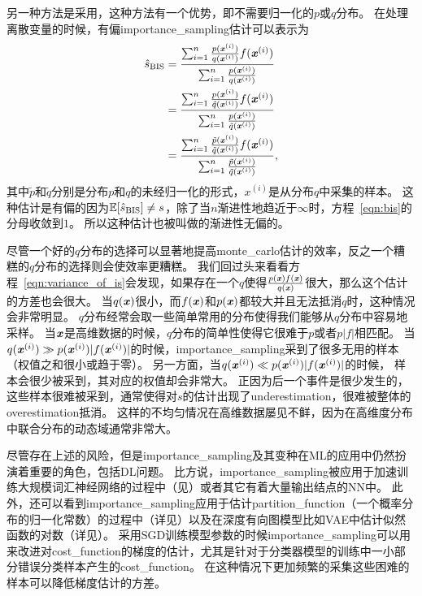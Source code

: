 另一种方法是采用，这种方法有一个优势，即不需要归一化的$p$或$q$分布。
在处理离散变量的时候，有偏\gls{importance_sampling}估计可以表示为
\begin{align}
\label{eqn:bis}
\hat{s}_{\text{BIS}} & = \frac{\sum_{i=1}^{n} \frac{p(\boldsymbol{\mathit{x}}^{(i)})}{q(\boldsymbol{\mathit{x}}^{(i)})} f(\boldsymbol{\mathit{x}}^{(i)})}{\sum_{i=1}^{n}\frac{p(\boldsymbol{\mathit{x}}^{(i)})}{q(\boldsymbol{\mathit{x}}^{(i)})}} \\
& = \frac{\sum_{i=1}^{n} \frac{p(\boldsymbol{\mathit{x}}^{(i)})}{\tilde{q}(\boldsymbol{\mathit{x}}^{(i)})} f(\boldsymbol{\mathit{x}}^{(i)})}{\sum_{i=1}^{n}\frac{p(\boldsymbol{\mathit{x}}^{(i)})}{\tilde{q}(\boldsymbol{\mathit{x}}^{(i)})}} \\
& = \frac{\sum_{i=1}^{n} \frac{\tilde{p}(\boldsymbol{\mathit{x}}^{(i)})}{\tilde{q}(\boldsymbol{\mathit{x}}^{(i)})} f(\boldsymbol{\mathit{x}}^{(i)})}{\sum_{i=1}^{n}\frac{\tilde{p}(\boldsymbol{\mathit{x}}^{(i)})}{\tilde{q}(\boldsymbol{\mathit{x}}^{(i)})}},
\end{align}
其中$\tilde{p}$和$\tilde{q}$分别是分布${p}$和${q}$的未经归一化的形式，$x^{(i)}$是从分布${q}$中采集的样本。
这种估计是有偏的因为$\mathbb{E}[\hat{s}_{\text{BIS}}]\neq s$，除了当$n$渐进性地趋近于$\infty$时，方程~\eqref{eqn:bis}的分母收敛到$1$。
所以这种估计也被叫做的渐进性无偏的。

尽管一个好的$q$分布的选择可以显著地提高\gls{monte_carlo}估计的效率，反之一个糟糕的$q$分布的选择则会使效率更糟糕。
我们回过头来看看方程~\eqref{eqn:variance_of_is}会发现，如果存在一个$q$使得$\frac{p(\boldsymbol{\mathit{x}})f(\boldsymbol{\mathit{x}})}{q(\boldsymbol{\mathit{x}})}$很大，那么这个估计的方差也会很大。
当$q(\boldsymbol{\mathit{x}})$很小，而$f(\boldsymbol{\mathit{x}})$和$p(\boldsymbol{\mathit{x}})$都较大并且无法抵消$q$时，这种情况会非常明显。
$q$分布经常会取一些简单常用的分布使得我们能够从$q$分布中容易地采样。
当$\boldsymbol{\mathit{x}}$是高维数据的时候，$q$分布的简单性使得它很难于$p$或者$p\vert f\vert$相匹配。
当$q(\boldsymbol{\mathit{x}}^{(i)})\gg p(\boldsymbol{\mathit{x}}^{(i)}) \vert f(\boldsymbol{\mathit{x}}^{(i)})\vert $的时候，\gls{importance_sampling}采到了很多无用的样本（权值之和很小或趋于零）。
另一方面，当$q(\boldsymbol{\mathit{x}}^{(i)})\ll p(\boldsymbol{\mathit{x}}^{(i)}) \vert f(\boldsymbol{\mathit{x}}^{(i)})\vert $的时候， 样本会很少被采到，其对应的权值却会非常大。
正因为后一个事件是很少发生的，这些样本很难被采到，通常使得对$s$的估计出现了\gls{underestimation}，很难被整体的\gls{overestimation}抵消。
这样的不均匀情况在高维数据屡见不鲜，因为在高维度分布中联合分布的动态域通常非常大。

尽管存在上述的风险，但是\gls{importance_sampling}及其变种在\gls{ML}的应用中仍然扮演着重要的角色，包括\gls{DL}问题。
比方说，\gls{importance_sampling}被应用于加速训练大规模词汇神经网络的过程中（见）或者其它有着大量输出结点的\gls{NN}中。
此外，还可以看到\gls{importance_sampling}应用于估计\gls{partition_function}（一个概率分布的归一化常数）的过程中（详见）以及在深度有向图模型比如\gls{VAE}中估计似然函数的对数（详见）。
采用\gls{SGD}训练模型参数的时候\gls{importance_sampling}可以用来改进对\gls{cost_function}的梯度的估计，尤其是针对于分类器模型的训练中一小部分错误分类样本产生的\gls{cost_function}。
在这种情况下更加频繁的采集这些困难的样本可以降低梯度估计的方差\citep{Hinton06}。


